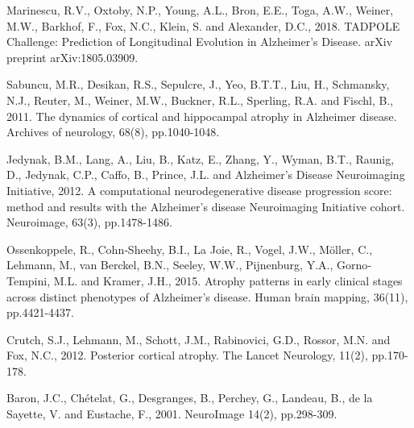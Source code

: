 \documentclass{llncs}
\begin{document}
\begin{thebibliography}{5}
Marinescu, R.V., Oxtoby, N.P., Young, A.L., Bron, E.E., Toga, A.W., Weiner, M.W., Barkhof, F., Fox, N.C., Klein, S. and Alexander, D.C., 2018. TADPOLE Challenge: Prediction of Longitudinal Evolution in Alzheimer's Disease. arXiv preprint arXiv:1805.03909.


Sabuncu, M.R., Desikan, R.S., Sepulcre, J., Yeo, B.T.T., Liu, H., Schmansky, N.J., Reuter, M., Weiner, M.W., Buckner, R.L., Sperling, R.A. and Fischl, B., 2011. The dynamics of cortical and hippocampal atrophy in Alzheimer disease. Archives of neurology, 68(8), pp.1040-1048.

Jedynak, B.M., Lang, A., Liu, B., Katz, E., Zhang, Y., Wyman, B.T., Raunig, D., Jedynak, C.P., Caffo, B., Prince, J.L. and Alzheimer's Disease Neuroimaging Initiative, 2012. A computational neurodegenerative disease progression score: method and results with the Alzheimer's disease Neuroimaging Initiative cohort. Neuroimage, 63(3), pp.1478-1486.

Ossenkoppele, R., Cohn‐Sheehy, B.I., La Joie, R., Vogel, J.W., Möller, C., Lehmann, M., van Berckel, B.N., Seeley, W.W., Pijnenburg, Y.A., Gorno‐Tempini, M.L. and Kramer, J.H., 2015. Atrophy patterns in early clinical stages across distinct phenotypes of Alzheimer's disease. Human brain mapping, 36(11), pp.4421-4437.

Crutch, S.J., Lehmann, M., Schott, J.M., Rabinovici, G.D., Rossor, M.N. and Fox, N.C., 2012. Posterior cortical atrophy. The Lancet Neurology, 11(2), pp.170-178.


Baron, J.C., Ch\'{e}telat, G., Desgranges, B., Perchey, G., Landeau, B., {de la Sayette}, V. and Eustache, F., 2001. NeuroImage 14(2), pp.298-309.



\end{thebibliography}

\clearpage
\end{document}
